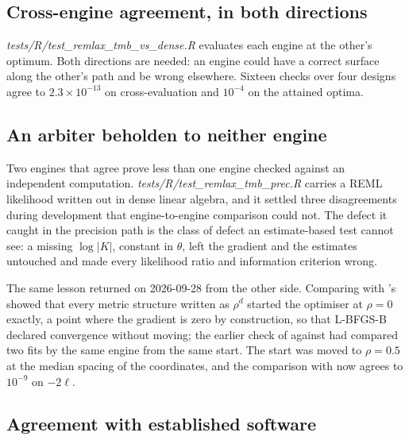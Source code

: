 \subsection{Cross-engine agreement, in both directions}

\emph{tests/R/test\_remlax\_tmb\_vs\_dense.R} evaluates each engine at the
other's optimum. Both directions are needed: an engine could have a correct
surface along the other's path and be wrong elsewhere. Sixteen checks over
four designs agree to $2.3 \times 10^{-13}$ on cross-evaluation and
$10^{-4}$ on the attained optima.

\subsection{An arbiter beholden to neither engine}

Two engines that agree prove less than one engine checked against an
independent computation. \emph{tests/R/test\_remlax\_tmb\_prec.R} carries a
REML likelihood written out in dense linear algebra, and it settled three
disagreements during development that engine-to-engine comparison could not.
The defect it caught in the precision path is the class of defect an
estimate-based test cannot see: a missing $\log|K|$, constant in $\theta$, left
the gradient and the estimates untouched and made every likelihood ratio and
information criterion wrong.

The same lesson returned on 2026-09-28 from the other side. Comparing
 with 's  showed that every metric
structure written as $\rho^{d}$ started the optimiser at $\rho = 0$ exactly,
a point where the gradient is zero by construction, so that L-BFGS-B declared
convergence without moving; the earlier check of  against
 had compared two fits by the same engine from the same start. The
start was moved to $\rho = 0.5$ at the median spacing of the coordinates, and
the comparison with  now agrees to $10^{-9}$ on $-2\ell$.

\subsection{Agreement with established software}

